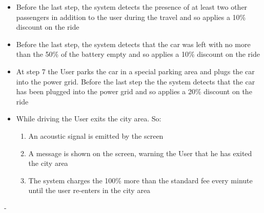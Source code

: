 {
	\begin{itemize}
	\item Before the last step, the system detects the presence of at least two other passengers in addition to the user during the 		         travel and so applies a 10\% discount on the ride
	\item Before the last step, the system detects that the car was left with no more than the 50\% of the battery empty and so 			         applies a 10\% discount on the ride
	\item At step 7 the User parks the car in a special parking area and plugs the car into the power grid. Before the last step the 
	         the system detects that the car has been plugged into the power grid and so applies a 20\% discount on the ride
	\item While driving the User exits the city area. So:
		\begin{enumerate}
		\item An acoustic signal is emitted by the screen
		\item A message is shown on the screen, warning the User that he has exited the city area
		\item The system charges the 100\% more than the standard fee every minute until the user re-enters in the city area
		\end{enumerate} 
	\end{itemize}

}
{-}



\pagebreak




\FloatBarrier


